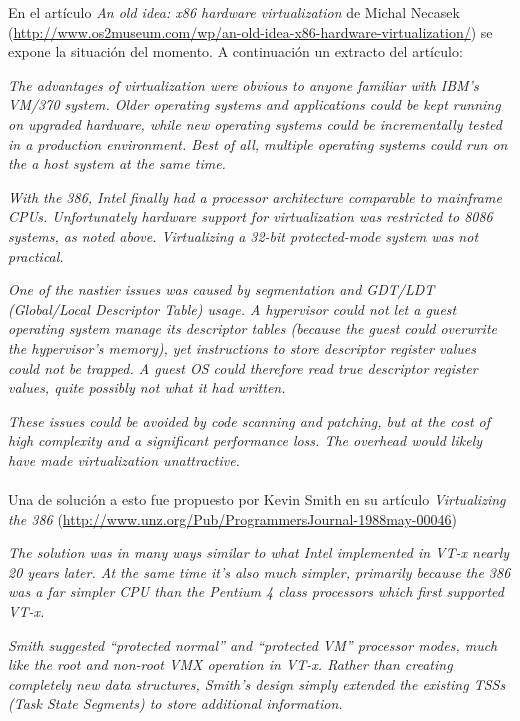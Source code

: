 \documentclass[12pt, times]{simauth}
\begin{document}
En el artículo \emph{An old idea: x86 hardware virtualization} de Michal Necasek (\url{http://www.os2museum.com/wp/an-old-idea-x86-hardware-virtualization/}) se expone la situación del momento. A continuación un extracto del artículo:

\textit{The advantages of virtualization were obvious to anyone familiar with IBM's VM/370 system. Older operating systems and applications could be kept running on upgraded hardware, while new operating systems could be incrementally tested in a production environment. Best of all, multiple operating systems could run on the a host system at the same time.}

\textit{With the 386, Intel finally had a processor architecture comparable to mainframe CPUs. Unfortunately hardware support for virtualization was restricted to 8086 systems, as noted above. Virtualizing a 32-bit protected-mode system was not practical.}

\textit{One of the nastier issues was caused by segmentation and GDT/LDT (Global/Local Descriptor Table) usage. A hypervisor could not let a guest operating system manage its descriptor tables (because the guest could overwrite the hypervisor’s memory), yet instructions to store descriptor register values could not be trapped. A guest OS could therefore read true descriptor register values, quite possibly not what it had written.}

\textit{These issues could be avoided by code scanning and patching, but at the cost of high complexity and a significant performance loss. The overhead would likely have made virtualization unattractive.}

\paragraph{}Una de solución a esto fue propuesto por Kevin Smith en su artículo \emph{Virtualizing the 386} (\url{http://www.unz.org/Pub/ProgrammersJournal-1988may-00046})

\textit{The solution was in many ways similar to what Intel implemented in VT-x nearly 20 years later. At the same time it’s also much simpler, primarily because the 386 was a far simpler CPU than the Pentium 4 class processors which first supported VT-x.}

\textit{Smith suggested ``protected normal'' and ``protected VM'' processor modes, much like the root and non-root VMX operation in VT-x. Rather than creating completely new data structures, Smith's design simply extended the existing TSSs (Task State Segments) to store additional information.}
\end{document}
